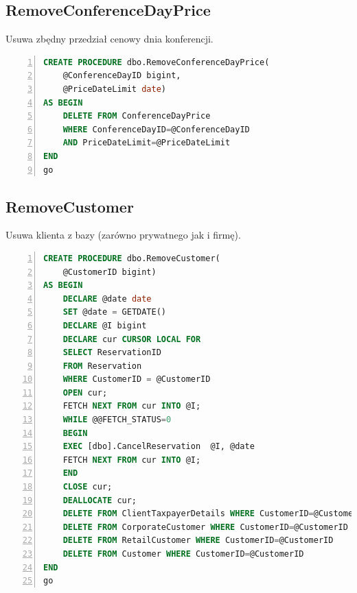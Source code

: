 \documentclass[]{article}
\begin{document}
	\subsection{RemoveConferenceDayPrice}
	Usuwa zbędny przedział cenowy dnia konferencji.
	\begin{lstlisting}[language=SQL,
						showspaces=false,
						basicstyle=\ttfamily,
						numbers=left,
						numberstyle=\tiny,
						backgroundcolor=\color{lightg},
						keywordstyle=\color{lightblue},
						commentstyle=\color{gray}]
CREATE PROCEDURE dbo.RemoveConferenceDayPrice(
	@ConferenceDayID bigint,
	@PriceDateLimit date)
AS BEGIN
	DELETE FROM ConferenceDayPrice
	WHERE ConferenceDayID=@ConferenceDayID
	AND PriceDateLimit=@PriceDateLimit
END
go
	\end{lstlisting}
	
	\subsection{RemoveCustomer}
	Usuwa klienta z bazy (zarówno prywatnego jak i firmę).
	\begin{lstlisting}[language=SQL,
						showspaces=false,
						basicstyle=\ttfamily,
						numbers=left,
						numberstyle=\tiny,
						backgroundcolor=\color{lightg},
						keywordstyle=\color{lightblue},
						commentstyle=\color{gray}]
CREATE PROCEDURE dbo.RemoveCustomer(
	@CustomerID bigint)
AS BEGIN
	DECLARE @date date
	SET @date = GETDATE()
	DECLARE @I bigint
	DECLARE cur CURSOR LOCAL FOR
	SELECT ReservationID
	FROM Reservation
	WHERE CustomerID = @CustomerID
	OPEN cur;
	FETCH NEXT FROM cur INTO @I;
	WHILE @@FETCH_STATUS=0
	BEGIN
	EXEC [dbo].CancelReservation  @I, @date
	FETCH NEXT FROM cur INTO @I;
	END
	CLOSE cur;
	DEALLOCATE cur;
	DELETE FROM ClientTaxpayerDetails WHERE CustomerID=@CustomerID
	DELETE FROM CorporateCustomer WHERE CustomerID=@CustomerID
	DELETE FROM RetailCustomer WHERE CustomerID=@CustomerID
	DELETE FROM Customer WHERE CustomerID=@CustomerID
END
go
	\end{lstlisting}
	
\end{document}
